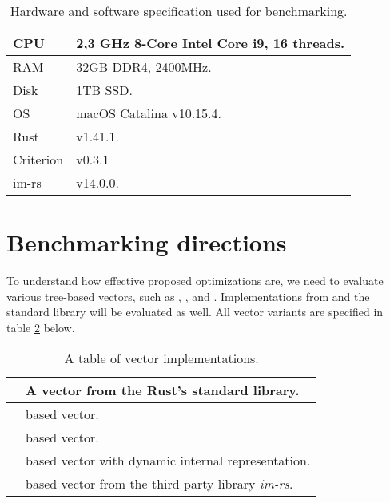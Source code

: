 \begin{table}[!htbp]
    \centering

    \begin{tabular} { |l| p{11cm} | }
        \hline CPU & 2,3 GHz 8-Core Intel Core i9, 16 threads. \\ \hline
        RAM & 32GB DDR4, 2400MHz. \\ \hline
        Disk & 1TB SSD. \\ \hline
        OS & macOS Catalina v10.15.4. \\ \hline
        Rust & v1.41.1. \\ \hline
        Criterion & v0.3.1 \\ \hline
        im-rs & v14.0.0. \\ \hline
    \end{tabular}

    \label{tab:exec-environment}
    \caption{Hardware and software specification used for benchmarking.}
\end{table}

\section{Benchmarking directions}
To understand how effective proposed optimizations are, we need to evaluate various tree-based vectors, such as \rbvec{}, \rrbvec{}, and \pvec{}. Implementations from \imrsvec{} and the standard library will be evaluated as well. All vector variants are specified in table \ref{tab:vec-implementations} below.

\begin{table}[!htbp]
    \centering

    \begin{tabular} { |l| p{11cm} | }
        \hline
        \stdvec{} & A vector from the Rust's standard library. \\ \hline
        \rbvec{} & \rbtree{} based vector. \\ \hline
        \rrbvec{} & \rrbtree{} based vector. \\ \hline
        \pvec{} & \rrbtree{} based vector with dynamic internal representation. \\ \hline
        \imrsvec{} & \rrbtree{} based vector from the third party library \emph{im-rs}\footnotemark{}. \\ \hline
    \end{tabular}

    \label{tab:vec-implementations}
    \caption{A table of vector implementations.}
\end{table}

